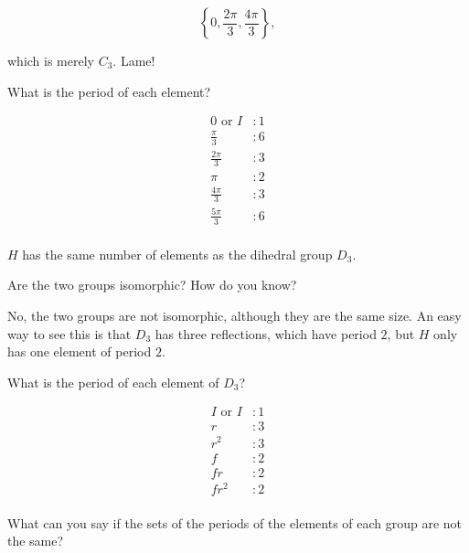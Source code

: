 \documentclass[../gatm_answers.tex]{subfiles}
\begin{document}
$$\left\{0,\frac{2\pi}{3},\frac{4\pi}{3}\right\},$$

which is merely $C_3$. Lame!

\begin{inner_problem}
\item What is the period of each element?
\end{inner_problem}

\begin{align*}
0\text{ or }I &: 1 \\
\frac{\pi}{3} &: 6 \\
\frac{2\pi}{3} &: 3 \\
\pi &: 2 \\
\frac{4\pi}{3} &: 3 \\
\frac{5\pi}{3} &: 6 \\
\end{align*}

\begin{outer_problem}
\item $H$ has the same number of elements as the dihedral group $D_3$. 
\end{outer_problem}

\begin{inner_problem}[start=1]
\item Are the two groups isomorphic? How do you know?
\end{inner_problem}

No, the two groups are not isomorphic, although they are the same size. An easy way to see this is that $D_3$ has three reflections, which have period $2$, but $H$ only has one element of period $2$.

\begin{inner_problem}
\item What is the period of each element of $D_3$?
\end{inner_problem}

\begin{align*}
I\text{ or }I &: 1 \\
r &: 3 \\
r^2  &: 3 \\
f &: 2 \\
fr &: 2 \\
fr^2 &: 2 \\
\end{align*}

\begin{inner_problem}
\item What can you say if the sets of the periods of the elements of each group are not the same?
\end{inner_problem}
\end{document}
